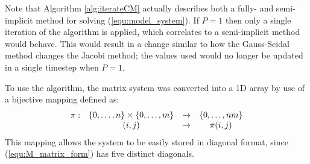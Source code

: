 Note that Algorithm \ref{alg:iterateCM} actually describes both a fully- and semi- implicit method for solving (\ref{equ:model_system}). 
If $P = 1$ then only a single iteration of the algorithm is applied, which correlates to a semi-implicit method would behave.
This would result in a change similar to how the Gauss-Seidal method changes the Jacobi method; the values used would no longer be updated in a single timestep when $P = 1$.

To use the algorithm, the matrix system was converted into a 1D array by use of a bijective mapping defined as:
\begin{equation}
\begin{array}{c c c c}
  \pi :& \{ 0, \ldots, n\} \times \{0, \ldots, m\} & \to & \{0, \ldots, nm \} \\
       & (i,j)                                     & \to & \pi(i,j)
\end{array}
\end{equation}
This mapping allows the system to be easily stored in diagonal format, since (\ref{equ:M_matrix_form}) has five distinct diagonals.


